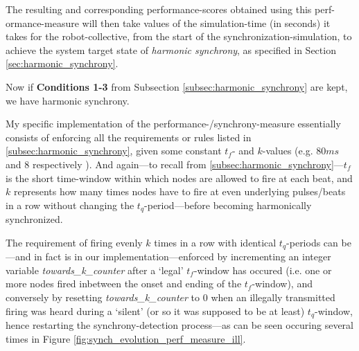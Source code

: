 		The resulting and corresponding performance-scores obtained using this perf-ormance-measure will then take values of the simulation-time (in seconds) it takes for the robot-collective, from the start of the synchronization-simulation, to achieve the system target state of \textit{harmonic synchrony}, as specified in Section \ref{sec:harmonic_synchrony}.

		Now if \textbf{Conditions 1-3} from Subsection \ref{subsec:harmonic_synchrony} are kept, we have harmonic synchrony.

		My specific implementation of the performance-/synchrony-measure essentially consists of enforcing all the requirements or rules listed in \ref{subsec:harmonic_synchrony}, given some constant $t_f$- and $k$-values (e.g. $80ms$ and $8$ respectively \cite{nymoen_synch}). And again—to recall from \ref{subsec:harmonic_synchrony}—$t_f$ is the short time-window within which nodes are allowed to fire at each beat, and $k$ represents how many times nodes have to fire at even underlying pulses/beats in a row without changing the $t_q$-period—before becoming harmonically synchronized.

		The requirement of firing evenly $k$ times in a row with identical $t_q$-periods can be—and in fact is in our implementation—enforced by incrementing an integer variable \textit{towards\_k\_counter} after a `legal' $t_f$-window has occured (i.e. one or more nodes fired inbetween the onset and ending of the $t_f$-window), and conversely by resetting \textit{towards\_k\_counter} to 0 when an illegally transmitted firing was heard during a `silent' (or so it was supposed to be at least) $t_q$-window, hence restarting the synchrony-detection process—as can be seen occuring several times in Figure \ref{fig:synch_evolution_perf_measure_ill}.


